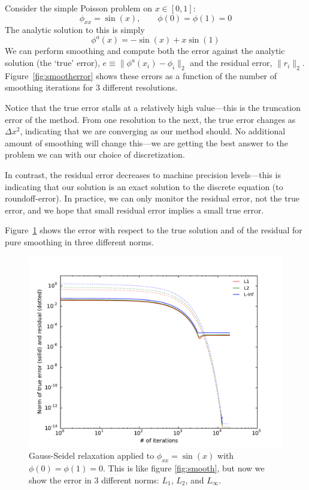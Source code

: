 Consider the simple Poisson problem on $x \in [0,1]$:
\begin{equation}
\phi_{xx} = \sin(x), \qquad \phi(0) = \phi(1) = 0
\end{equation}
The analytic solution to this is simply 
\begin{equation}
\phi^a(x) = -\sin(x) + x \sin(1)
\end{equation}
We can perform smoothing and compute both the error against the
analytic solution (the `true' error), $e \equiv \| \phi^a(x_i) - \phi_i \|_2$ and the
residual error, $\| r_i \|_2$.  Figure~\ref{fig:smootherror} shows these
errors as a function of the number of smoothing iterations for 3
different resolutions.

Notice that the true error stalls at a relatively high value---this is
the truncation error of the method.  From one resolution to the next,
the true error changes as $\Delta x^2$, indicating that we are
converging as our method should.  No additional amount of smoothing
will change this---we are getting the best answer to the problem we
can with our choice of discretization.

In contrast, the residual error decreases to machine precision
levels---this is indicating that our solution is an exact solution to
the discrete equation (to roundoff-error).
In practice, we can only monitor the residual error, not the true
error, and we hope that small residual error implies a small true
error.

Figure~\ref{fig:smoothnorms} shows the error
with respect to the true solution and of the residual for pure smoothing
in three different norms.

\begin{figure}
\centering
\includegraphics[width=\linewidth]{smooth-error-norms}
\caption[Convergence of smoothing in different norms]{\label{fig:smoothnorms} 
  Gauss-Seidel relaxation applied to $\phi_{xx} = \sin(x)$ with
  $\phi(0) = \phi(1) = 0$.  This is like figure \ref{fig:smooth}, but
  now we show the error in 3 different norms: $L_1$, $L_2$, and $L_\infty$.
  \\ }
\end{figure}

